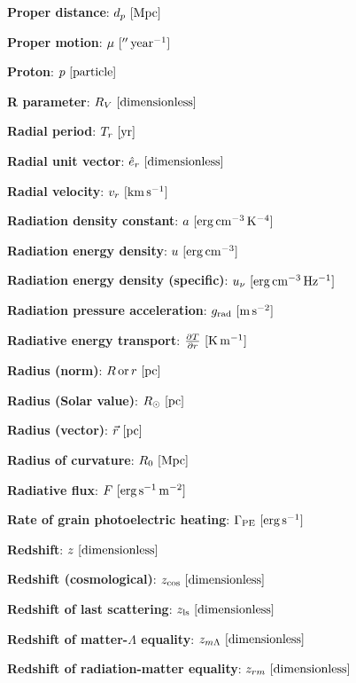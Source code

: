 \documentclass[a4paper,10pt]{article}
\begin{document}
{\noindent}\textbf{Proper distance}: $d_p ~ [{\rm Mpc}]$

{\noindent}\textbf{Proper motion}: $\mu ~ [{\rm ''\,year^{-1}}]$

{\noindent}\textbf{Proton}: $p ~ [{\rm particle}]$

{\noindent}\textbf{R parameter}: $R_V ~ [{\rm dimensionless}]$

{\noindent}\textbf{Radial period}: $T_r ~ [{\rm yr}]$

{\noindent}\textbf{Radial unit vector}: $\hat{e}_r ~ [{\rm dimensionless}]$

{\noindent}\textbf{Radial velocity}: $v_r ~ [{\rm km\,s^{-1}}]$

{\noindent}\textbf{Radiation density constant}: $a ~ [{\rm erg\,cm^{-3}\,K^{-4}}]$

{\noindent}\textbf{Radiation energy density}: $u ~ [{\rm erg\,cm^{-3}}]$

{\noindent}\textbf{Radiation energy density (specific)}: $u_\nu ~
[{\rm erg\,cm^{-3}\,Hz^{-1}}]$

{\noindent}\textbf{Radiation pressure acceleration}: $g_{\rm rad} ~ [{\rm m\,s^{-2}}]$

{\noindent}\textbf{Radiative energy transport}: $\frac{\partial T}{\partial r} ~ [{\rm K\,m^{-1}}]$

{\noindent}\textbf{Radius (norm)}: $R\,{\rm or}\,r ~ [{\rm pc}]$

{\noindent}\textbf{Radius (Solar value)}: $R_\odot ~ [{\rm pc}]$

{\noindent}\textbf{Radius (vector)}: $\vec{r} ~ [{\rm pc}]$

{\noindent}\textbf{Radius of curvature}: $R_0 ~ [{\rm Mpc}]$

{\noindent}\textbf{Radiative flux}: $F ~ [{\rm erg\,s^{-1}\,m^{-2}}]$

{\noindent}\textbf{Rate of grain photoelectric heating}: $\Gamma_{\rm PE} ~ [{\rm erg\,s^{-1}}]$

{\noindent}\textbf{Redshift}: $z ~ [{\rm dimensionless}]$

{\noindent}\textbf{Redshift (cosmological)}: $z_\mathrm{cos} ~ [{\rm dimensionless}]$

{\noindent}\textbf{Redshift of last scattering}: $z_\mathrm{ls} ~ [{\rm dimensionless}]$

{\noindent}\textbf{Redshift of matter-$\Lambda$ equality}: $z_{m\Lambda} ~ [{\rm dimensionless}]$

{\noindent}\textbf{Redshift of radiation-matter equality}: $z_{rm} ~ [{\rm dimensionless}]$
\end{document}
